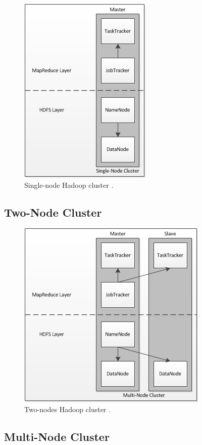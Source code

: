 \begin{figure}[htbp]
  \centering
    \includegraphics{./img/singlenode}
  \caption{Single-node Hadoop cluster \cite{nollsingle}.}
  \label{fig:singlenode}
\end{figure}

\subsection{Two-Node Cluster}
\cite{nollmulti}

\begin{figure}[htbp]
  \centering
    \includegraphics{./img/twonode}
  \caption{Two-nodes Hadoop cluster \cite{nollmulti}.}
  \label{fig:twonode}
\end{figure}

\subsection{Multi-Node Cluster}